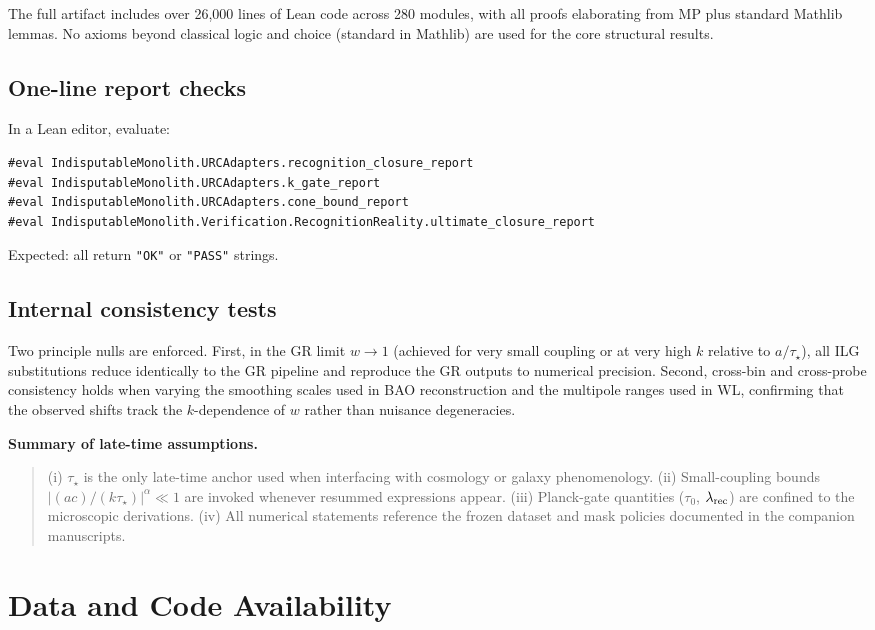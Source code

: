 \documentclass[11pt]{article}
\begin{document}
The full artifact includes over 26,000 lines of Lean code across 280 modules, with all proofs elaborating from MP plus standard Mathlib lemmas. No axioms beyond classical logic and choice (standard in Mathlib) are used for the core structural results.

\subsection*{One-line report checks}

In a Lean editor, evaluate:
\begin{verbatim}
#eval IndisputableMonolith.URCAdapters.recognition_closure_report
#eval IndisputableMonolith.URCAdapters.k_gate_report
#eval IndisputableMonolith.URCAdapters.cone_bound_report
#eval IndisputableMonolith.Verification.RecognitionReality.ultimate_closure_report
\end{verbatim}

Expected: all return \texttt{"OK"} or \texttt{"PASS"} strings.

\subsection{Internal consistency tests}
Two principle nulls are enforced. First, in the GR limit $w\!\to\!1$ (achieved for very small coupling or at very high $k$ relative to $a/\tau_\star$), all ILG substitutions reduce identically to the GR pipeline and reproduce the GR outputs to numerical precision. Second, cross-bin and cross-probe consistency holds when varying the smoothing scales used in BAO reconstruction and the multipole ranges used in WL, confirming that the observed shifts track the $k$-dependence of $w$ rather than nuisance degeneracies. %

\noindent\textbf{Summary of late-time assumptions.}
\begin{quote}
  (i) $\tau_\star$ is the only late-time anchor used when interfacing with cosmology or galaxy phenomenology. (ii) Small-coupling bounds $|(a c)/(k\tau_\star)|^{\alpha}\ll 1$ are invoked whenever resummed expressions appear. (iii) Planck-gate quantities ($\tau_0$, $\lambda_{\rm rec}$) are confined to the microscopic derivations. (iv) All numerical statements reference the frozen dataset and mask policies documented in the companion manuscripts.
\end{quote}

\section*{Data and Code Availability}
\end{document}
